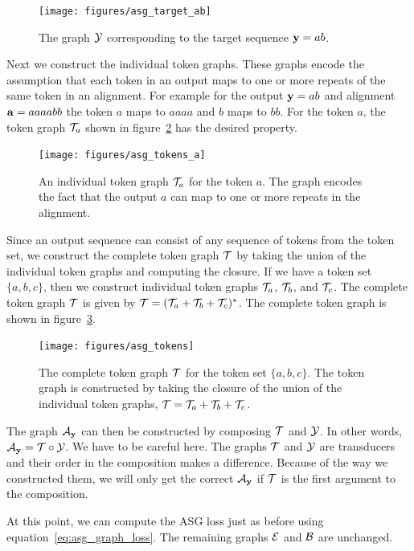 \begin{figure}
    \centering
    \texttt{[image: figures/asg\_target\_ab]}
    \caption{The graph $\mathcal{Y}$ corresponding to the target sequence ${\bf y} = ab$.}
    \label{fig:asg_target_ab}
\end{figure}

Next we construct the individual token graphs. These graphs encode the
assumption that each token in an output maps to one or more repeats of the same
token in an alignment. For example for the output ${\bf y} = ab$ and alignment ${\bf a}
= aaaabb$ the token $a$ maps to $aaaa$ and $b$ maps to  $bb$. For the token
$a$, the token graph $\mathcal{T}_a$ shown in figure~\ref{fig:asg_tokens_a} has the
desired property.

\begin{figure}
    \centering
    \texttt{[image: figures/asg\_tokens\_a]}
    \caption{An individual token graph $\mathcal{T}_a$ for the token $a$. The graph
    encodes the fact that the output $a$ can map to one or more repeats in the
    alignment.}
    \label{fig:asg_tokens_a}
\end{figure}

Since an output sequence can consist of any sequence of tokens from the token
set, we construct the complete token graph $\mathcal{T}$ by taking the union of the
individual token graphs and computing the closure. If we have a token set $\{a,
b, c\}$, then we construct individual token graphs $\mathcal{T}_a$, $\mathcal{T}_b$, and
$\mathcal{T}_c$. The complete token graph $\mathcal{T}$ is given by $\mathcal{T} = (\mathcal{T}_a + \mathcal{T}_b +
\mathcal{T}_c)^*$. The complete token graph is shown in figure~\ref{fig:asg_tokens}.

\begin{figure}
    \centering
    \texttt{[image: figures/asg\_tokens]}
    \caption{The complete token graph $\mathcal{T}$ for the token set $\{a, b, c\}$.
    The token graph is constructed by taking the closure of the union of the
    individual token graphs, $\mathcal{T} = \mathcal{T}_a + \mathcal{T}_b + \mathcal{T}_c$.}
    \label{fig:asg_tokens}
\end{figure}

The graph $\mathcal{A}_{\bf y}$ can then be constructed by composing $\mathcal{T}$ and $\mathcal{Y}$. In
other words, $\mathcal{A}_{\bf y} = \mathcal{T} \circ \mathcal{Y}$. We have to be careful here. The graphs
$\mathcal{T}$ and $\mathcal{Y}$ are transducers and their order in the composition makes a
difference. Because of the way we constructed them, we will only get the
correct $\mathcal{A}_{\bf y}$ if $\mathcal{T}$ is the first argument to the composition.

At this point, we can compute the ASG loss just as before using
equation~\ref{eq:asg_graph_loss}. The remaining graphs $\mathcal{E}$ and $\mathcal{B}$ are
unchanged.

